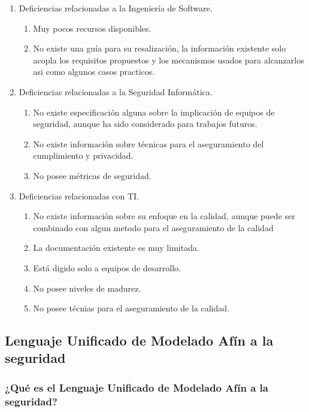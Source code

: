 \documentclass[runningheads,a4paper]{llncs}
\begin{document}
\begin{enumerate}
	\item Deficiencias relacionadas a la Ingeniería de \gls{Software}.
		\begin{enumerate}
			\item Muy pocos recursos disponibles. 
			\item No existe una guía para su resalización, la información existente solo acopla los requisitos propuestos y los mecanismos usados para alcanzarlos asi como algunos casos practicos.\\
			
		\end{enumerate}
	\item Deficiencias relacionadas a la Seguridad Informática.
		\begin{enumerate}
			\item No existe especificación alguna sobre la implicación de equipos de seguridad, aunque ha sido considerado para trabajos futuros.
			\item No existe información sobre técnicas para el aseguramiento del cumplimiento y privacidad.				\item No posee métricas de seguridad.\\
						
		\end{enumerate}
	\item Deficiencias relacionadas con \gls{TI}.
		\begin{enumerate}
			\item No existe información sobre su enfoque en la calidad, aunque puede ser combinado con algun metodo para el aseguramiento de la calidad
			\item La documentación existente es muy limitada.
			\item Está digido solo a equipos de desarrollo.
			\item No posee niveles de madurez.
			\item No posee técnias para el aseguramiento de la calidad.
			
		\end{enumerate}
\end{enumerate}


\subsection{Lenguaje Unificado de Modelado Afín a la seguridad}

\subsubsection{¿Qué es el Lenguaje Unificado de Modelado Afín a la seguridad?}
\end{document}
